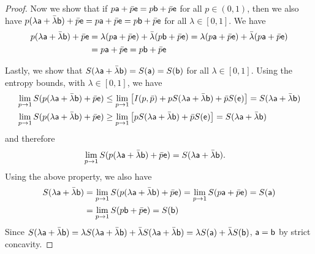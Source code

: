 \begin{mathSection}
\begin{proof}
	Now we show that if  $p\ens[a] + \bar{p} \ens = p \ens[b] + \bar{p} \ens$ for all $p \in (0,1)$, then we also have $p(\lambda\ens[a] + \bar{\lambda}\ens[b]) + \bar{p} \ens = p\ens[a] + \bar{p} \ens = p \ens[b] + \bar{p} \ens$ for all $\lambda \in [0,1]$. We have
	\begin{equation}
		\begin{aligned}
			p(\lambda\ens[a] + \bar{\lambda}\ens[b]) + \bar{p} \ens &= \lambda(p \ens[a] + \bar{p} \ens) + \bar{\lambda}(p\ens[b] + \bar{p} \ens) = \lambda(p \ens[a] + \bar{p} \ens) + \bar{\lambda}(p\ens[a] + \bar{p} \ens) \\
			&= p\ens[a] + \bar{p} \ens = p\ens[b] + \bar{p} \ens 
		\end{aligned}
	\end{equation}
	
	Lastly, we show that $S(\lambda \ens[a] + \bar{\lambda} \ens[b]) = S(\ens[a]) = S(\ens[b])$ for all $\lambda \in [0,1]$. Using the entropy bounds, with $\lambda \in [0,1]$, we have
	\begin{equation}
		\begin{aligned}
			\lim\limits_{p \to 1} S(p(\lambda\ens[a] + \bar{\lambda}\ens[b]) + \bar{p}\ens) &\leq \lim\limits_{p \to 1} \left[ I(p,\bar{p}) + p S(\lambda\ens[a] + \bar{\lambda}\ens[b]) + \bar{p} S(\ens) \right] = S(\lambda\ens[a] + \bar{\lambda}\ens[b]) \\
			\lim\limits_{p \to 1} S(p(\lambda\ens[a] + \bar{\lambda}\ens[b]) + \bar{p}\ens) &\geq \lim\limits_{p \to 1} \left[ p S(\lambda\ens[a] + \bar{\lambda}\ens[b]) + \bar{p} S(\ens) \right] = S(\lambda\ens[a] + \bar{\lambda}\ens[b])
		\end{aligned}
	\end{equation}
	and therefore
	\begin{equation}
		\begin{aligned}		
			\lim\limits_{p \to 1} S(p(\lambda\ens[a] + \bar{\lambda}\ens[b]) + \bar{p}\ens) &= S(\lambda\ens[a] + \bar{\lambda}\ens[b]).
		\end{aligned}
	\end{equation}
	Using the above property, we also have
	\begin{equation}
		\begin{aligned}
			S(\lambda\ens[a] + \bar{\lambda}\ens[b]) &= \lim\limits_{p \to 1} S(p(\lambda\ens[a] + \bar{\lambda}\ens[b]) + \bar{p}\ens) = \lim\limits_{p \to 1} S(p \ens[a] +\bar{p} \ens) = S(\ens[a]) \\
			&= \lim\limits_{p \to 1} S(p \ens[b] +\bar{p} \ens) = S(\ens[b]) \\
		\end{aligned}
	\end{equation}
	Since $S(\lambda\ens[a] + \bar{\lambda}\ens[b]) = \lambda S(\lambda\ens[a] + \bar{\lambda}\ens[b]) + \bar{\lambda} S(\lambda\ens[a] + \bar{\lambda}\ens[b]) = \lambda S(\ens[a]) + \bar{\lambda} S(\ens[b])$, $\ens[a] = \ens[b]$ by strict concavity.
\end{proof}
\end{mathSection}

